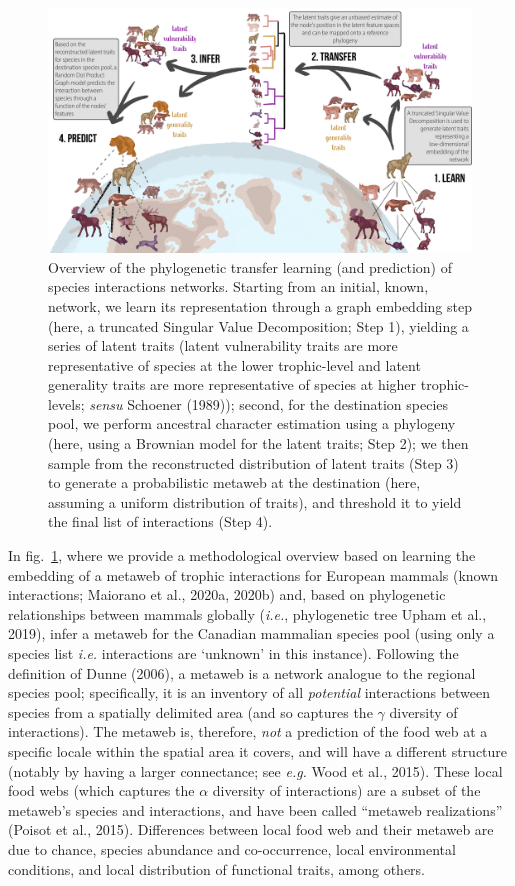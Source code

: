 \documentclass[10pt,oneside]{article}
\makeatletter
\def\maxwidth{\ifdim\Gin@nat@width>\linewidth\linewidth
\else\Gin@nat@width\fi}
\let\Oldincludegraphics\includegraphics
\renewcommand{\includegraphics}[1]{\Oldincludegraphics[width=\maxwidth]{#1}}
\makeatother
\begin{document}
\begin{figure}
\hypertarget{fig:concept}{%
\centering
\includegraphics{figures/figure-concept_v2.png}
\caption{Overview of the phylogenetic transfer learning (and prediction)
of species interactions networks. Starting from an initial, known,
network, we learn its representation through a graph embedding step
(here, a truncated Singular Value Decomposition; Step 1), yielding a
series of latent traits (latent vulnerability traits are more
representative of species at the lower trophic-level and latent
generality traits are more representative of species at higher
trophic-levels; \emph{sensu} Schoener (1989)); second, for the
destination species pool, we perform ancestral character estimation
using a phylogeny (here, using a Brownian model for the latent traits;
Step 2); we then sample from the reconstructed distribution of latent
traits (Step 3) to generate a probabilistic metaweb at the destination
(here, assuming a uniform distribution of traits), and threshold it to
yield the final list of interactions (Step 4).}\label{fig:concept}
}
\end{figure}

In fig.~\ref{fig:concept}, where we provide a methodological overview
based on learning the embedding of a metaweb of trophic interactions for
European mammals (known interactions; Maiorano et al., 2020a, 2020b)
and, based on phylogenetic relationships between mammals globally
(\emph{i.e.}, phylogenetic tree Upham et al., 2019), infer a metaweb for
the Canadian mammalian species pool (using only a species list
\emph{i.e.} interactions are `unknown' in this instance). Following the
definition of Dunne (2006), a metaweb is a network analogue to the
regional species pool; specifically, it is an inventory of all
\emph{potential} interactions between species from a spatially delimited
area (and so captures the \(\gamma\) diversity of interactions). The
metaweb is, therefore, \emph{not} a prediction of the food web at a
specific locale within the spatial area it covers, and will have a
different structure (notably by having a larger connectance; see
\emph{e.g.} Wood et al., 2015). These local food webs (which captures
the \(\alpha\) diversity of interactions) are a subset of the metaweb's
species and interactions, and have been called ``metaweb realizations''
(Poisot et al., 2015). Differences between local food web and their
metaweb are due to chance, species abundance and co-occurrence, local
environmental conditions, and local distribution of functional traits,
among others.
\end{document}

